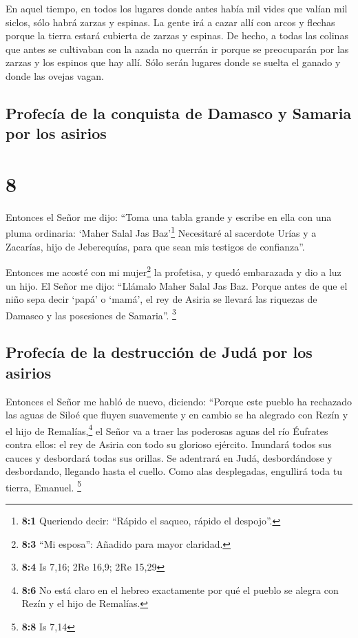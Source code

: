  En aquel tiempo, en todos los lugares donde antes había
mil vides que valían mil siclos, sólo habrá zarzas y espinas.
 La gente irá a cazar allí con arcos y flechas porque la
tierra estará cubierta de zarzas y espinas.  De hecho, a
todas las colinas que antes se cultivaban con la azada no querrán ir
porque se preocuparán por las zarzas y los espinos que hay allí. Sólo
serán lugares donde se suelta el ganado y donde las ovejas vagan.

\hypertarget{profecuxeda-de-la-conquista-de-damasco-y-samaria-por-los-asirios}{%
\subsection{Profecía de la conquista de Damasco y Samaria por los
asirios}\label{profecuxeda-de-la-conquista-de-damasco-y-samaria-por-los-asirios}}

\hypertarget{section-7}{%
\section{8}\label{section-7}}

 Entonces el Señor me dijo: ``Toma una tabla grande y
escribe en ella con una pluma ordinaria: `Maher Salal Jas
Baz'\footnote{\textbf{8:1} Queriendo decir: ``Rápido el saqueo, rápido
  el despojo''.}  Necesitaré al sacerdote Urías y a
Zacarías, hijo de Jeberequías, para que sean mis testigos de
confianza''.

 Entonces me acosté con mi mujer\footnote{\textbf{8:3}
  ``Mi esposa'': Añadido para mayor claridad.} la profetisa, y quedó
embarazada y dio a luz un hijo. El Señor me dijo: ``Llámalo Maher Salal
Jas Baz.  Porque antes de que el niño sepa decir `papá' o
`mamá', el rey de Asiria se llevará las riquezas de Damasco y las
posesiones de Samaria''. \footnote{\textbf{8:4} Is 7,16; 2Re 16,9; 2Re
  15,29}

\hypertarget{profecuxeda-de-la-destrucciuxf3n-de-juduxe1-por-los-asirios}{%
\subsection{Profecía de la destrucción de Judá por los
asirios}\label{profecuxeda-de-la-destrucciuxf3n-de-juduxe1-por-los-asirios}}

 Entonces el Señor me habló de nuevo, diciendo:
 ``Porque este pueblo ha rechazado las aguas de Siloé que
fluyen suavemente y en cambio se ha alegrado con Rezín y el hijo de
Remalías,\footnote{\textbf{8:6} No está claro en el hebreo exactamente
  por qué el pueblo se alegra con Rezín y el hijo de Remalías.}
 el Señor va a traer las poderosas aguas del río Éufrates
contra ellos: el rey de Asiria con todo su glorioso ejército. Inundará
todos sus cauces y desbordará todas sus orillas.  Se
adentrará en Judá, desbordándose y desbordando, llegando hasta el
cuello. Como alas desplegadas, engullirá toda tu tierra, Emanuel.
\footnote{\textbf{8:8} Is 7,14}

